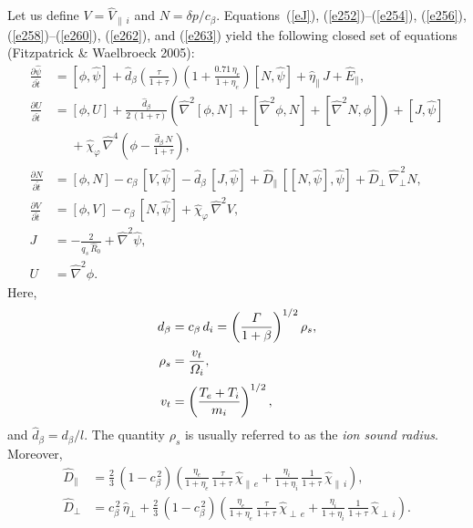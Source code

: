 \documentclass[notitlepage,12pt]{article}
\begin{document}
Let us define $V=\hat{V}_{\parallel\,i}$ and $N=\delta p/c_\beta$. Equations~(\ref{eJ}), (\ref{e252})--(\ref{e254}), (\ref{e256}), (\ref{e258})--(\ref{e260}), (\ref{e262}), and (\ref{e263}) yield the following closed set of equations (Fitzpatrick \& Waelbroeck 2005):
\begin{align}\label{e264}
\frac{\partial\hat{\psi}}{\partial\hat{t}}&= [\phi,\hat{\psi}] + \hat{d}_\beta\!\left(\frac{\tau}{1+\tau}\right)\left(1+\frac{0.71\,\eta_e}{1+\eta_e}\right)[N,\hat{\psi}]
+\hat{\eta}_\parallel\,J + \hat{E}_\parallel,\\[0.5ex]
\frac{\partial U}{\partial \hat{t}}&= [\phi,U] + \frac{\hat{d}_\beta}{2\,(1+\tau)}\left(\hat{\nabla}^2[\phi,N] + [\hat{\nabla}^2\phi,N] + [\hat{\nabla}^2 N,\phi]\right) + [J,\hat{\psi}] \nonumber\\[0.5ex]&\phantom{=}+\hat{\chi}_\varphi  \,\hat{\nabla}^4\!\left(\phi - \frac{\hat{d}_\beta\,N}{1+\tau}\right),\label{e265} \\[0.5ex]
\frac{\partial N}{\partial \hat{t}}&= [\phi,N] -c_\beta\,[V,\hat{\psi}] -\hat{d}_\beta\,[J,\hat{\psi}] + \hat{D}_\parallel\,[[N,\hat{\psi}],\hat{\psi}]
+ \hat{D}_\perp\,\hat{\nabla}_\perp^{\,2}N,\label{e266}\\[0.5ex]
\frac{\partial V}{\partial\hat{t}}&= [\phi,V] - c_\beta\,[N,\hat{\psi}] + \hat{\chi}_\varphi\,\hat{\nabla}^2 V,\label{e267}\\[0.5ex]
J &=-\frac{2}{q_s\,\hat{R}_0}+\hat{\nabla}^2\hat{\psi},\\[0.5ex]
U &=\hat{\nabla}^2 \phi.\label{e269}
\end{align}
Here, 
\begin{align}\label{e270}
d_\beta &= c_\beta\,d_i = \left(\frac{{\mit\Gamma}}{1+\beta}\right)^{1/2}\rho_s,\\[0.5ex]
 \rho_s &= \frac{v_t}{{\mit\Omega}_i},\\[0.5ex]
v_t &= \left(\frac{T_e+T_i}{m_i}\right)^{1/2},
\end{align}
and $\hat{d}_\beta=d_\beta/l$. The quantity $\rho_s$ is usually referred to as the {\em ion sound radius}. 
Moreover,
\begin{align}
\hat{D}_\parallel&= \frac{2}{3}\,(1-c_\beta^{\,2})\!\left(\frac{\eta_e}{1+\eta_e}\,\frac{\tau}{1+\tau}\,\hat{\chi}_{\parallel\,e} + \frac{\eta_i}{1+\eta_i}\,\frac{1}{1+\tau}\,\hat{\chi}_{\parallel\,i}\right),\\[0.5ex]
\hat{D}_\perp &= c_\beta^{\,2}\,\hat{\eta}_\perp +  \frac{2}{3}\,(1-c_\beta^{\,2})\!\left(\frac{\eta_e}{1+\eta_e}\,\frac{\tau}{1+\tau}\,\hat{\chi}_{\perp\,e} + \frac{\eta_i}{1+\eta_i}\,\frac{1}{1+\tau}\,\hat{\chi}_{\perp\,i}\right).
\end{align}
\end{document}

